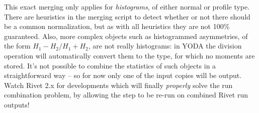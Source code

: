 \begin{warning}
  This exact merging only applies for \emph{histograms}, of either normal or
  profile type. There are heuristics in the merging script to detect whether or
  not there should be a common normalization, but as with all heuristics they
  are not 100\% guaranteed. Also, more complex objects such as histogrammed
  asymmetries, of the form $H_1 - H_2 / H_1 + H_2$, are not really histograms:
  in YODA the division operation will automatically convert them to the
   type, for which no moments are stored. It's not possible to
  combine the statistics of such objects in a straightforward way -- so for now
  only one of the input copies will be output. Watch Rivet 2.x for developments
  which will finally \emph{properly} solve the run combination problem, by
  allowing the  step to be re-run on combined Rivet run outputs!
\end{warning}





